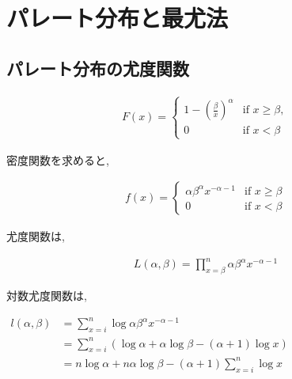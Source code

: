 \documentclass{article}
\begin{document}
\section{パレート分布と最尤法}

\subsection{パレート分布の尤度関数}

\begin{center}
	\begin{gather}
		F(x) = \begin{cases} 
			1 - \left( \frac{\beta}{x} \right)^\alpha & \text{if } x \geq \beta, \\
			0 & \text{if } x < \beta 
		\end{cases}
	\end{gather}
\end{center}

密度関数を求めると,

\begin{center}
	\begin{gather}
		f(x) = \begin{cases} 
			\alpha\beta^\alpha x^{-\alpha-1} & \text{if } x \geq \beta \\
			0 & \text{if } x < \beta 
		\end{cases}
	\end{gather}
\end{center}

尤度関数は,

\begin{center}
	\begin{gather}
		L(\alpha, \beta) = \prod_{x = \beta}^{n} \alpha\beta^\alpha x^{-\alpha-1}
	\end{gather}
\end{center}

対数尤度関数は,

\begin{center}
	\begin{math}
    \begin{aligned}
      l(\alpha, \beta) &= \sum_{x = i}^{n} \log\alpha\beta^\alpha x^{-\alpha-1} \\
    &= \sum_{x = i}^{n} (\log\alpha + \alpha\log\beta - (\alpha + 1) \log x) \\
      &= n\log\alpha + n\alpha\log\beta - (\alpha + 1) \sum_{x=i}^{n}\log x
    \end{aligned}
	\end{math}
\end{center}
\end{document}
